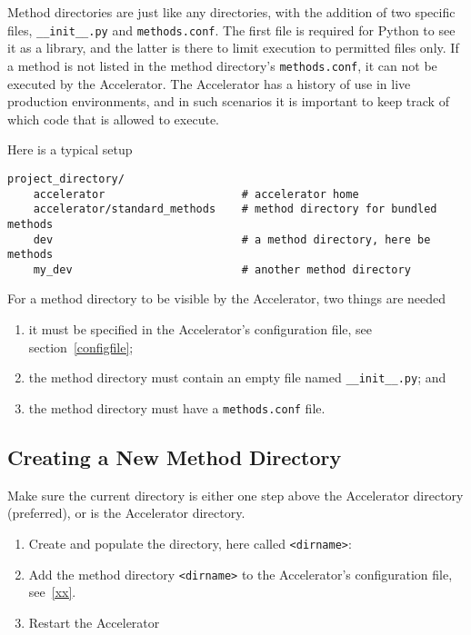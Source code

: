 Method directories are just like any directories, with the addition of
two specific files, \texttt{\_\_init\_\_.py} and \texttt{methods.conf}.
The first file is required for Python to see it as a library, and the
latter is there to limit execution to permitted files only.  If a
method is not listed in the method directory's \texttt{methods.conf},
it can not be executed by the Accelerator.  The Accelerator has a
history of use in live production environments, and in such scenarios
it is important to keep track of which code that is allowed to
execute.

Here is a typical setup
\begin{verbatim}
project_directory/
    accelerator                     # accelerator home
    accelerator/standard_methods    # method directory for bundled methods
    dev                             # a method directory, here be methods
    my_dev                          # another method directory
\end{verbatim}
For a method directory to be visible by the Accelerator, two things are needed
\begin{enumerate}
\item it must be specified in the Accelerator's configuration file,
  see section~\ref{configfile};
\item the method directory must contain an empty file named
  \texttt{\_\_init\_\_.py}; and
\item the method directory must have a \texttt{methods.conf} file.
\end{enumerate}

\subsection*{Creating a New Method Directory}
Make sure the current directory is either one step above the
Accelerator directory (preferred), or is the Accelerator directory.
\begin{enumerate}
\item Create and populate the directory, here called \texttt{<dirname>}:
  \begin{shell}
  \end{shell}
\item Add the method directory \texttt{<dirname>} to the Accelerator's
  configuration file, see~\ref{xx}.
\item Restart the Accelerator
\end{enumerate}


